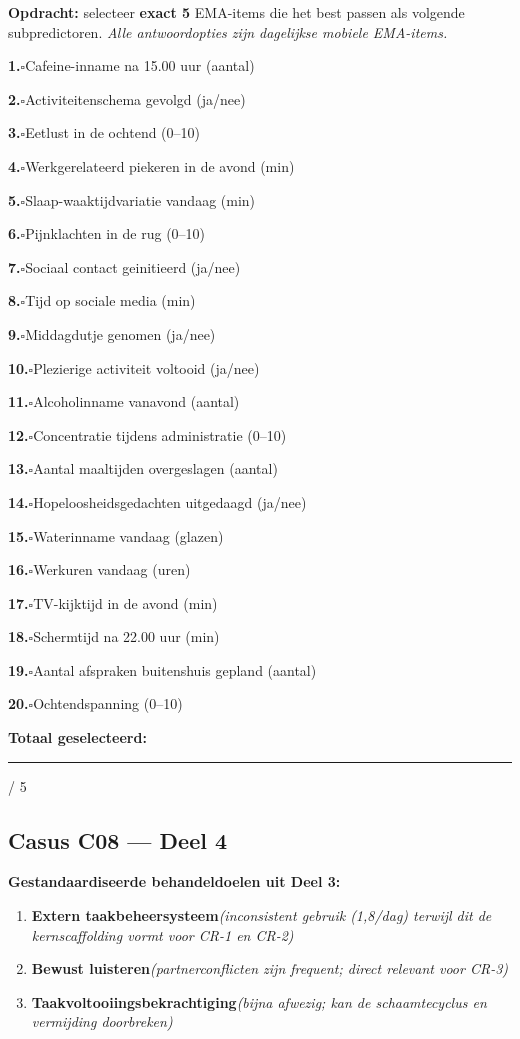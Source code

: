 \documentclass[11pt,a4paper]{article}
\newcommand{\checkitemBFS}[2]{%
\noindent\small\textbf{#1.}\hspace{0.45em}$\square$\hspace{0.4em}#2\par\vspace{0.20em}}
\begin{document}
\begin{responsebox}
\small\textbf{Opdracht:} selecteer \textbf{exact 5} EMA-items die het best passen als volgende subpredictoren.
\textit{Alle antwoordopties zijn dagelijkse mobiele EMA-items.}

\checkitemBFS{1}{Cafeine-inname na 15.00 uur (aantal)}
\checkitemBFS{2}{Activiteitenschema gevolgd (ja/nee)}
\checkitemBFS{3}{Eetlust in de ochtend (0--10)}
\checkitemBFS{4}{Werkgerelateerd piekeren in de avond (min)}
\checkitemBFS{5}{Slaap-waaktijdvariatie vandaag (min)}
\checkitemBFS{6}{Pijnklachten in de rug (0--10)}
\checkitemBFS{7}{Sociaal contact geinitieerd (ja/nee)}
\checkitemBFS{8}{Tijd op sociale media (min)}
\checkitemBFS{9}{Middagdutje genomen (ja/nee)}
\checkitemBFS{10}{Plezierige activiteit voltooid (ja/nee)}
\checkitemBFS{11}{Alcoholinname vanavond (aantal)}
\checkitemBFS{12}{Concentratie tijdens administratie (0--10)}
\checkitemBFS{13}{Aantal maaltijden overgeslagen (aantal)}
\checkitemBFS{14}{Hopeloosheidsgedachten uitgedaagd (ja/nee)}
\checkitemBFS{15}{Waterinname vandaag (glazen)}
\checkitemBFS{16}{Werkuren vandaag (uren)}
\checkitemBFS{17}{TV-kijktijd in de avond (min)}
\checkitemBFS{18}{Schermtijd na 22.00 uur (min)}
\checkitemBFS{19}{Aantal afspraken buitenshuis gepland (aantal)}
\checkitemBFS{20}{Ochtendspanning (0--10)}
\vspace{0.4em}
\noindent\textbf{Totaal geselecteerd:}\hspace{0.5em}\rule{1.2cm}{0.25pt}\hspace{0.2em}/ 5
\end{responsebox}

\vspace{0.6em}
\newpage
\subsection*{Casus C08 --- Deel 4}

\begin{contextbox}
\small\textbf{Gestandaardiseerde behandeldoelen uit Deel 3:}
\begin{enumerate}[topsep=2pt,itemsep=1pt,label=\arabic*.]
\item \textbf{Extern taakbeheersysteem}\quad\textit{\small (inconsistent gebruik (1,8/dag) terwijl dit de kernscaffolding vormt voor CR-1 en CR-2)}
\item \textbf{Bewust luisteren}\quad\textit{\small (partnerconflicten zijn frequent; direct relevant voor CR-3)}
\item \textbf{Taakvoltooiingsbekrachtiging}\quad\textit{\small (bijna afwezig; kan de schaamtecyclus en vermijding doorbreken)}
\end{enumerate}
\end{contextbox}
\end{document}
